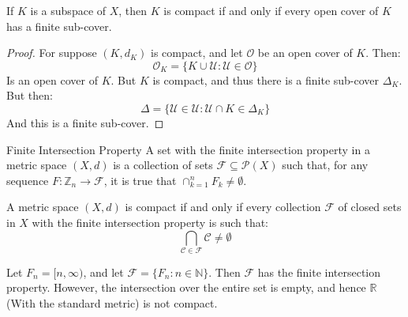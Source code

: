 \documentclass[crop=false,class=book,oneside]{standalone}
\begin{document}
            \begin{theorem}
                If $K$ is a subspace of $X$, then $K$ is compact
                if and only if every open cover of $K$ has a
                finite sub-cover.
            \end{theorem}
            \begin{proof}
                For suppose $(K,d_{K})$ is compact, and let
                $\mathcal{O}$ be an open cover of $K$. Then:
                \begin{equation}
                    \mathcal{O}_{K}=\{K\cup\mathcal{U}:
                        \mathcal{U}\in\mathcal{O}\}
                \end{equation}
                Is an open cover of $K$. But $K$ is compact,
                and thus there is a finite sub-cover
                $\Delta_{K}$. But then:
                \begin{equation}
                    \Delta=\{\mathcal{U}\in\mathcal{U}:
                             \mathcal{U}\cap{K}\in\Delta_{K}\}
                \end{equation}
                And this is a finite sub-cover.
            \end{proof}
            \begin{ldefinition}{Finite Intersection Property}
                A set with the finite intersection property
                in a metric space $(X,d)$ is a collection of sets
                $\mathscr{F}\subseteq\mathcal{P}(X)$ such that,
                for any sequence
                $F:\mathbb{Z}_{n}\rightarrow\mathscr{F}$, 
                it is true that $\cap_{k=1}^{n}F_{k}\ne\emptyset$.
            \end{ldefinition}
            \begin{theorem}
                A metric space $(X,d)$ is compact if and only if
                every collection $\mathscr{F}$ of closed sets in
                $X$ with the
                finite intersection property is such that:
                \begin{equation}
                    \bigcap_{\mathcal{C}\in\mathcal{F}}
                        \mathcal{C}\ne\emptyset
                \end{equation}
            \end{theorem}
            \begin{lexample}
                Let $F_{n}=[n,\infty)$, and let
                $\mathscr{F}=\{F_{n}:n\in\mathbb{N}\}$.
                Then $\mathscr{F}$ has the finite intersection
                property. However, the intersection over the
                entire set is empty, and hence $\mathbb{R}$
                (With the standard metric) is not compact.
            \end{lexample}
\end{document}
